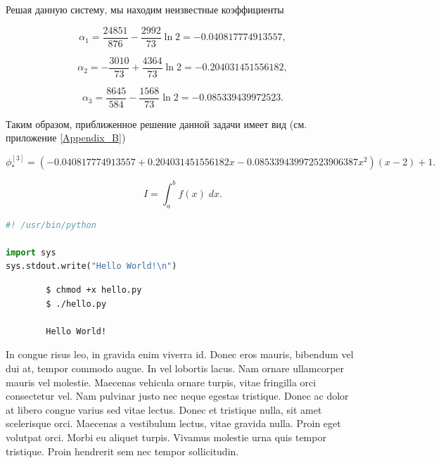 \documentclass{article}
\begin{document}
\noindent Решая данную систему, мы находим неизвестные коэффициенты

\begin{displaymath}
	\alpha_{1} = \frac{24851}{876} - \frac{2992}{73} \ln{2} = -0.040817774913557,
\end{displaymath}

\begin{equation}	
	\alpha_{2} = -\frac{3010}{73} + \frac{4364}{73} \ln{2} = -0.204031451556182, 
\end{equation}

\begin{displaymath}
	\alpha_{3} = \frac{8645}{584} - \frac{1568}{73} \ln{2} = -0.085339439972523.
\end{displaymath}

Таким образом, приближенное решение данной задачи имеет вид (см. приложение \ref{Appendix_B})

\begin{equation}	
	\phi_{\ast}^{[3]} = (-0.040817774913557+0.204031451556182x -0.085339439972523906387x^2)(x-2) + 1.
\end{equation}


\newpage



\begin{equation}
	I = \int_{a}^{b} f(x) \; dx.
\end{equation}

\begin{file}[hello.py]
\begin{lstlisting}[language=Python]
#! /usr/bin/python

import sys
sys.stdout.write("Hello World!\n")
\end{lstlisting}
\end{file}

\begin{commandline}
	\begin{verbatim}
		$ chmod +x hello.py
		$ ./hello.py

		Hello World!
	\end{verbatim}
\end{commandline}

\begin{warn}[Notice:]
  In congue risus leo, in gravida enim viverra id. Donec eros mauris, bibendum vel dui at, tempor commodo augue. In vel lobortis lacus. Nam ornare ullamcorper mauris vel molestie. Maecenas vehicula ornare turpis, vitae fringilla orci consectetur vel. Nam pulvinar justo nec neque egestas tristique. Donec ac dolor at libero congue varius sed vitae lectus. Donec et tristique nulla, sit amet scelerisque orci. Maecenas a vestibulum lectus, vitae gravida nulla. Proin eget volutpat orci. Morbi eu aliquet turpis. Vivamus molestie urna quis tempor tristique. Proin hendrerit sem nec tempor sollicitudin.
\end{warn}
\end{document}
